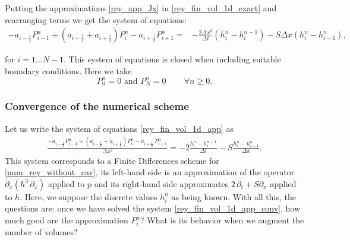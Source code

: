 Putting the approximations \eqref*{rey_app_Jx} in \eqref{rey_fin_vol_1d_exact} and rearranging terms we get the system of equations:
\begin{align}
-a_{i-\frac{1}{2}} P_{i-1}^n
+\left(a_{i-\frac{1}{2}}+a_{i+\frac{1}{2}}\right)P_i^n
-a_{i+\frac{1}{2}} P_{i+1}^n={}&-\frac{2\Delta x ^2}{\Delta t}\left(h_{i}^{n}-h_{i}^{n-1}\right)-S\Delta x\left(h_i^n-h_{i-1}^n\right),\label{eq:rey_fin_vol_1d_app}
\end{align}

for $i=1\ldots N-1$. This system of equations is closed when including suitable boundary conditions. Here we take 
\begin{equation}
P^n_0=0\text{ and }P^n_{N}=0\,\qquad \forall n\geq 0.\label{eq:bound_gauss} 
\end{equation}

\subsubsection*{Convergence of the numerical scheme}
Let us write the system of equations \eqref*{rey_fin_vol_1d_app} as
\begin{align}
\frac{-a_{i-\frac{1}{2}} P_{i-1}^n
+\left(a_{i-\frac{1}{2}}+a_{i+\frac{1}{2}}\right)P_i^n
-a_{i+\frac{1}{2}}\, P_{i+1}^n}{\Delta x^2}=-2\frac{h_{i}^{n}-h_{i}^{n-1}}{\Delta t}-S\frac{h_i^n-h_{i-1}^n}{\Delta x}.\label{eq:rey_fin_vol_1d_app_conv}
\end{align}
This system corresponds to a Finite Differences scheme for \eqref{num_rey_without_cav}, its left-hand side is an approximation of the operator $\partial_x(h^3\, \partial_x )$ applied to $p$ and its right-hand side approximates $2\,\partial _t+S\partial_x$ applied to $h$. Here, we suppose the discrete values $h_i^n$ as being known. With all this, the questions are: once we have solved the system  \eqref*{rey_fin_vol_1d_app_conv}, how much good are the approximation $P_i^n$? What is its behavior when we augment the number of volumes?

